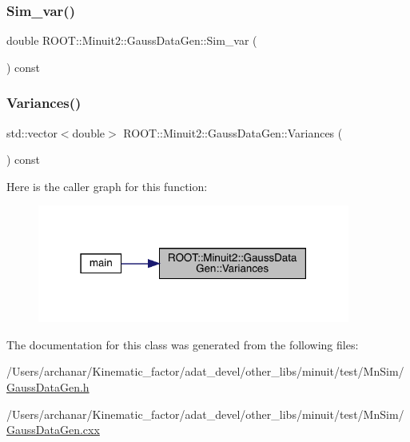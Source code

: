 \mbox{\label{classROOT_1_1Minuit2_1_1GaussDataGen_ab46d49eb0cd02fcf7e5799258133c91b}} 
\subsubsection{\texorpdfstring{Sim\_var()}{Sim\_var()}}
{\footnotesize\ttfamily double R\+O\+O\+T\+::\+Minuit2\+::\+Gauss\+Data\+Gen\+::\+Sim\+\_\+var (\begin{DoxyParamCaption}{ }\end{DoxyParamCaption}) const\hspace{0.3cm}{\ttfamily [inline]}}

\mbox{\label{classROOT_1_1Minuit2_1_1GaussDataGen_ab2f22917ba4f242a2888c908a8629260}} 
\subsubsection{\texorpdfstring{Variances()}{Variances()}}
{\footnotesize\ttfamily std\+::vector$<$double$>$ R\+O\+O\+T\+::\+Minuit2\+::\+Gauss\+Data\+Gen\+::\+Variances (\begin{DoxyParamCaption}{ }\end{DoxyParamCaption}) const\hspace{0.3cm}{\ttfamily [inline]}}

Here is the caller graph for this function\+:\nopagebreak
\begin{figure}[H]
\begin{center}
\leavevmode
\includegraphics[width=291pt]{d8/d75/classROOT_1_1Minuit2_1_1GaussDataGen_ab2f22917ba4f242a2888c908a8629260_icgraph}
\end{center}
\end{figure}


The documentation for this class was generated from the following files\+:\begin{DoxyCompactItemize}
\item 
/\+Users/archanar/\+Kinematic\+\_\+factor/adat\+\_\+devel/other\+\_\+libs/minuit/test/\+Mn\+Sim/\mbox{\hyperlink{GaussDataGen_8h}{Gauss\+Data\+Gen.\+h}}\item 
/\+Users/archanar/\+Kinematic\+\_\+factor/adat\+\_\+devel/other\+\_\+libs/minuit/test/\+Mn\+Sim/\mbox{\hyperlink{GaussDataGen_8cxx}{Gauss\+Data\+Gen.\+cxx}}\end{DoxyCompactItemize}
